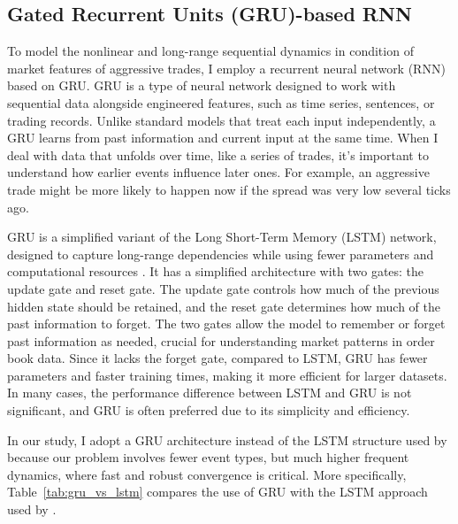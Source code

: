 \subsection{Gated Recurrent Units (GRU)-based RNN}
To model the nonlinear and long-range sequential dynamics in condition of market features of aggressive trades, I employ a recurrent neural network (RNN) based on GRU. GRU is a type of neural network designed to work with sequential data alongside engineered features, such as time series, sentences, or trading records. Unlike standard models that treat each input independently, a GRU learns from past information and current input at the same time. When I deal with data that unfolds over time, like a series of trades, it's important to understand how earlier events influence later ones. For example, an aggressive trade might be more likely to happen now if the spread was very low several ticks ago. 

GRU is a simplified variant of the Long Short-Term Memory (LSTM) network, designed to capture long-range dependencies while using fewer parameters and computational resources \citep{GRU2014}. It has a simplified architecture with two gates: the update gate and reset gate. The update gate controls how much of the previous hidden state should be retained, and the reset gate determines how much of the past information to forget. The two gates allow the model to remember or forget past information as needed, crucial for understanding market patterns in order book data. Since it lacks the forget gate, compared to LSTM, GRU has fewer parameters and faster training times, making it more efficient for larger datasets. In many cases, the performance difference between LSTM and GRU is not significant, and GRU is often preferred due to its simplicity and efficiency. 

In our study, I adopt a GRU architecture instead of the LSTM structure used by \cite{lalor_event-based_2025} because our problem involves fewer event types, but much higher frequent dynamics, where fast and robust convergence is critical. More specifically, Table~\ref{tab:gru_vs_lstm} compares the use of GRU with the LSTM approach used by \cite{lalor_event-based_2025}.

